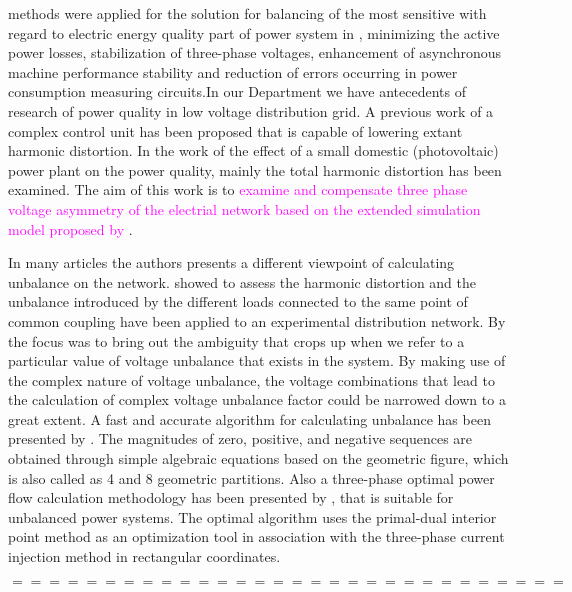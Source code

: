 methods were applied for the solution for balancing of the most sensitive with regard to electric energy quality part of power system in \cite{uimethod},  minimizing the active power losses, stabilization of three-phase voltages, enhancement of asynchronous machine performance stability and reduction of errors occurring in power consumption measuring circuits.In our Department we have antecedents of research of power quality in low voltage  distribution grid. A previous work of \cite{gorbe2012reduction} a complex control unit has been proposed that is capable of lowering extant harmonic distortion. In the work of \cite{Gorbe2014experimental} the effect of a small domestic (photovoltaic) power plant on the power quality, mainly the total harmonic distortion has been examined. The aim of this work is to \textcolor{magenta}{examine and compensate three phase voltage asymmetry of the electrial network based on the extended simulation model proposed by \cite{gorbe2012reduction}}.

    In many articles the authors presents a different viewpoint of calculating unbalance on the network. \cite{martin2015unbalance} showed to assess the harmonic distortion and the unbalance introduced by the different loads connected to the same point of common coupling have been applied to an experimental distribution network.  By \cite{kini2007novel} the focus was to bring out the ambiguity that crops up when we refer to a particular value of voltage unbalance that exists in the system. By making use of the complex nature of voltage unbalance, the voltage combinations that lead to the calculation of complex voltage unbalance factor could be narrowed down to a great extent. A fast and accurate algorithm for calculating unbalance has been presented by \cite{wen2014approximate}. The magnitudes of zero, positive, and negative sequences are obtained through simple algebraic equations based on the geometric figure, which is also called as 4 and 8 geometric partitions. Also a three-phase optimal power flow calculation methodology has been presented by \cite{araujo2013three}, that is suitable for unbalanced power systems. The optimal algorithm uses the primal-dual interior point method as an optimization tool in association with the three-phase current injection method in rectangular coordinates.%

    $$ ============================== $$

